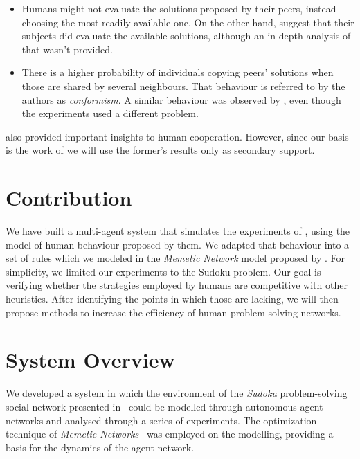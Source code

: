 \documentclass[letterpaper]{article}
\begin{document}
\begin{itemize}
	\item Humans might not evaluate the solutions proposed by their peers, instead choosing the most readily available one. On the other hand, \cite{mason:collablearnet} suggest that their subjects did evaluate the available solutions, although an in-depth analysis of that wasn't provided.
	\item There is a higher probability of individuals copying peers' solutions when those are shared by several neighbours. That behaviour is referred to by the authors as \emph{conformism}. A similar behaviour was observed by \cite{mason:collablearnet}, even though the experiments used a different problem.
\end{itemize}

\cite{mason:collablearnet} also provided important insights to human cooperation. However, since our basis is the work of \cite{farenzena:collabem} we will use the former's results only as secondary support.

\section{Contribution}

We have built a multi-agent system that simulates the experiments of \cite{farenzena:collabem}, using the model of human behaviour proposed by them. We adapted that behaviour into a set of rules which we modeled in the \emph{Memetic Network} model proposed by \cite{lamb:memenet}. For simplicity, we limited our experiments to the Sudoku problem. Our goal is verifying whether the strategies employed by humans are competitive with other heuristics. After identifying the points in which those are lacking, we will then propose methods to increase the efficiency of human problem-solving networks.

\section{System Overview}

We developed a system in which the environment of the {\em Sudoku} problem-solving social network presented in~\cite{farenzena:collabem} could be modelled through autonomous agent networks and analysed through a series of experiments. The optimization technique of {\em Memetic Networks}~\cite{lamb:memenet} was employed on the modelling, providing a basis for the dynamics of the agent network.
\end{document}
